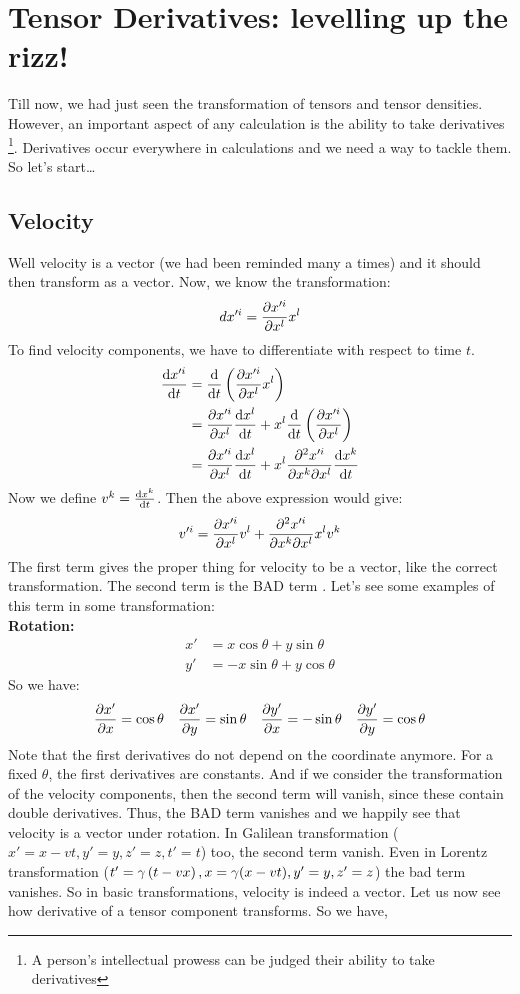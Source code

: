 \section{Tensor Derivatives: levelling up the rizz!}
Till now, we had just seen the transformation of tensors and tensor densities. However, an important aspect of any calculation is the ability to take derivatives \footnote{A person's intellectual prowess can be judged their ability to take derivatives }. Derivatives occur everywhere in calculations and we need a way to tackle them. So let's start\dots

\subsection{Velocity}
Well velocity is a vector (we had been reminded many a times) and it should then transform as a vector. Now, 
we know the transformation:
$$dx'^i = \pdv{x'^i}{x^l}x^l$$
To find velocity components, we have to differentiate with respect to time $t$. 
\begin{align*}
    \dv{x'^i}{t} &= \dv{t}\left( \pdv{x'^i}{x^l}x^l \right)\\
    &=\pdv{x'^i}{x^l}\dv{x^l}{t} + x^l \dv{t}\left( \pdv{x'^i}{x^l} \right)\\
    &=\pdv{x'^i}{x^l}\dv{x^l}{t} + x^l \pdv{x'^i}{x^k}{x^l}\dv{x^k}{t}
\end{align*}
Now we define $v^k = \dv{x^k}{t}$. Then the above expression would give:
\begin{align*}
    v'^i = \pdv{x'^i}{x^l}v^l +  \pdv{x'^i}{x^k}{x^l}x^l v^k
\end{align*}
The first term gives the proper thing for velocity to be a vector, like the correct transformation. The second term is the BAD term . Let's see some examples of this term in some transformation:\\[0.3cm]
\textbf{Rotation:}
\begin{align*}
    x' &= x\cos\theta+y\sin\theta\\
    y'&=-x\sin\theta + y\cos\theta
\end{align*}
So we have: 
\begin{align*}
    \pdv{x'}{x} = \cos\theta \quad  \pdv{x'}{y} = \sin\theta \quad  \pdv{y'}{x} = -\sin\theta \quad
    \pdv{y'}{y} = \cos\theta
\end{align*}
Note that the first derivatives do not depend on the coordinate anymore. For a fixed $\theta$, the first derivatives are constants. 
And if we consider the transformation of the velocity components, then the second term will vanish, since these contain double derivatives. Thus, the BAD term vanishes and we happily see that velocity is a vector under rotation. In Galilean transformation ($x'=x-vt, y'=y, z'=z, t'=t$) too, the second term vanish. Even in Lorentz transformation ($t' = \gamma \left( t-vx \right), x=\gamma(x-vt), y'=y, z'=z$) the bad term vanishes. So in basic transformations, velocity is indeed a vector. Let us now see how derivative of a tensor component transforms. So we have,

